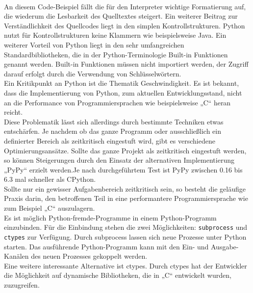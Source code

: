 \documentclass[../Bachelorarbeit.tex]{subfiles}
\begin{document}
\mbox{}\\
An  diesem  Code-Beispiel  fällt  die  für  den  Interpreter  wichtige  Formatierung  auf,  die
wiederum die Lesbarkeit des Quelltextes steigert. Ein weiterer Beitrag zur Verständlichkeit
des Quellcodes liegt in den simplen Kontrollstrukturen. Python nutzt für Kontrollstrukturen
keine Klammern wie beispielsweise Java. 
Ein weiterer Vorteil von Python liegt in den sehr umfangreichen Standardbibliotheken, die 
in der Python-Terminologie Built-in Funktionen genannt werden. Built-in Funktionen 
müssen nicht importiert werden, der Zugriff darauf erfolgt durch die Verwendung von 
Schlüsselwörtern. \\
Ein Kritikpunkt an Python ist die Thematik Geschwindigkeit. Es ist bekannt, dass die 
Implementierung von Python, zum aktuellen Entwicklungsstand, nicht an die Performance 
von Programmiersprachen wie beispielsweise „C“ heran reicht.
\parencite[vgl.][]{python_vs_c} \\
Diese Problematik lässt sich allerdings durch bestimmte Techniken etwas entschärfen. Je 
nachdem ob das ganze Programm oder ausschließlich ein definierter Bereich als 
zeitkritisch eingestuft wird, gibt es verschiedene Optimierungsansätze. Sollte das ganze 
Projekt als zeitkritisch eingestuft werden, so können Steigerungen durch den Einsatz der 
alternativen Implementierung „PyPy“ erzielt werden.Je nach durchgeführtem Test ist PyPy zwischen 0.16 bis 6.3 mal schneller als CPython.
\parencite[vgl.][]{pypy_speedtest} \\
Sollte nur ein gewisser Aufgabenbereich zeitkritisch sein, so besteht die geläufige Praxis 
darin, den betroffenen Teil in eine performantere Programmiersprache wie zum Beispiel 
„C“ auszulagern.\\
Es ist möglich Python-fremde-Programme in einem Python-Programm einzubinden. Für 
die Einbindung stehen die zwei Möglichkeiten: \texttt{subprocess} und \texttt{ctypes} zur Verfügung. 
Durch subprocess lassen sich neue Prozesse unter Python starten. Das ausführende 
Python-Programm kann mit den Ein- und Ausgabe-Kanälen des neuen Prozesses 
gekoppelt werden. \\
Eine weitere interessante Alternative ist ctypes. Durch ctypes hat der Entwickler die 
Möglichkeit auf dynamische Bibliotheken, die in „C“ entwickelt wurden, zuzugreifen. 
\parencite[vgl.][]{ctypes} \\
\end{document}
